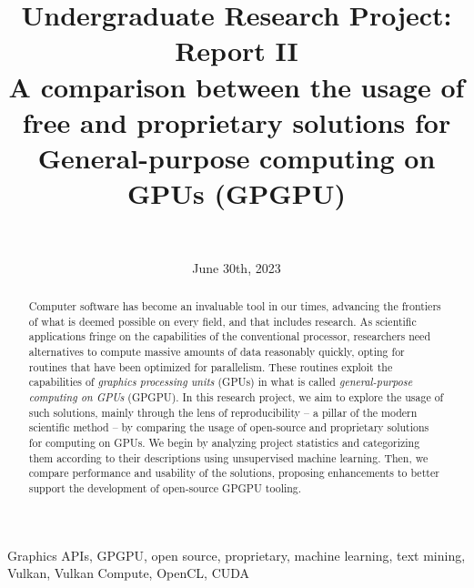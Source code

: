 \documentclass[conference, onecolumn]{IEEEtran}
\begin{document}
\title{\textbf{Undergraduate Research Project: Report II} \\
{A comparison between the usage of free and proprietary solutions for General-purpose computing on GPUs (GPGPU)}
}

\date{June 30th, 2023}

\author{ \\
\and
{}
}

\maketitle

\begin{abstract}
    Computer software has become an invaluable tool in our times, advancing
    the frontiers of what is deemed possible on every field, and that includes
    research.
    As scientific applications fringe on the capabilities of the conventional
    processor, researchers need alternatives to compute massive amounts of data
    reasonably quickly, opting for routines that have been optimized for
    parallelism.
    These routines exploit the capabilities of \textit{graphics processing
    units} (GPUs) in what is called \textit{general-purpose computing on GPUs}
    (GPGPU).
    In this research project, we aim to explore the usage of such solutions,
    mainly through the lens of reproducibility -- a pillar of the modern
    scientific method -- by comparing the usage of open-source and proprietary
    solutions for computing on GPUs.
    We begin by analyzing project statistics and categorizing them according to
    their descriptions using unsupervised machine learning.
    Then, we compare performance and usability of the solutions, proposing
    enhancements to better support the development of open-source GPGPU
    tooling.
\end{abstract}

\begin{IEEEkeywords}
    Graphics APIs, GPGPU, open source, proprietary, machine learning, text
    mining, Vulkan, Vulkan Compute, OpenCL, CUDA
\end{IEEEkeywords}
\end{document}
